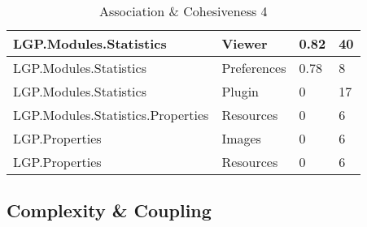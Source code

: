 \begin{table}[h!t]
{\begin{tabular}{ | p{85mm} | p{35mm} | p{13mm} | p{14mm}  | }
				LGP.Modules.Statistics & Viewer & 0.82  & \cellcolor{ored}40 \\ \hline
				LGP.Modules.Statistics & Preferences & 0.78  & 8 \\ \hline
				LGP.Modules.Statistics & Plugin & 0     & 17 \\ \hline
				LGP.Modules.Statistics.Properties & Resources & 0     & 6 \\ \hline
				LGP.Properties & Images & 0     & 6 \\ \hline
				LGP.Properties & Resources & 0     & 6 \\ \hline
				\end{tabular}}
				
				\caption{Association \& Cohesiveness 4}			
				\label{tab:AssociationCohesiveness4}
				
			\end{table}
		
		\newpage	
			
		\subsection{Complexity \& Coupling}	
		\label{sec:ComplexityCoupling}
			
